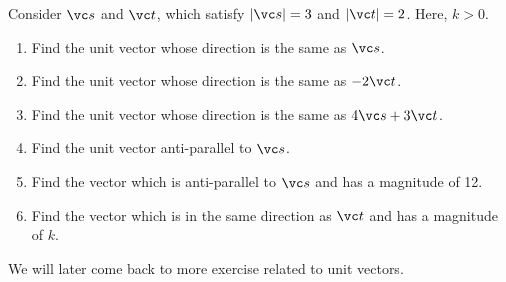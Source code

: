 \documentclass[11pt,pdfa,lastpage]{MishoNote}
\begin{document}
\begin{problems}
 \Problem[A] Consider $\vc s$ and $\vc t$, which satisfy $|\vc s|=3$ and $|\vc t|=2$. Here, $k>0$.
 \begin{enumerate}
   \item Find the unit vector whose direction is the same as $\vc s$.
   \item Find the unit vector whose direction is the same as $-2\vc t$.
   \item Find the unit vector whose direction is the same as $4\vc s+3\vc t$.
   \item Find the unit vector anti-parallel to $\vc s$.
   \item Find the vector which is anti-parallel to $\vc s$ and has a magnitude of 12.
   \item Find the vector which is in the same direction as $\vc t$ and has a magnitude of $k$.
 \end{enumerate}
\end{problems}

We will later come back to more exercise related to unit vectors.

\newpage
\end{document}
